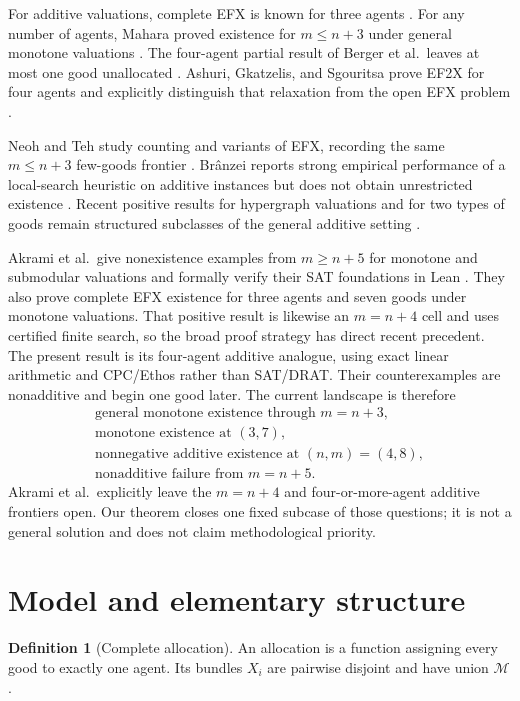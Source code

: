 \documentclass[11pt]{article}
\theoremstyle{definition}
\newtheorem{definition}[theorem]{Definition}
\newcommand{\M}{\mathcal{M}}
\begin{document}
For additive valuations, complete EFX is known for three agents
\cite{CGM2024}. For any number of agents, Mahara proved existence for
$m\le n+3$ under general monotone valuations \cite{Mahara2021}. The
four-agent partial result of Berger et al.\ leaves at most one good
unallocated \cite{Berger2022}. Ashuri, Gkatzelis, and Sgouritsa prove EF2X
for four agents and explicitly distinguish that relaxation from the open EFX
problem \cite{Ashuri2025}.

Neoh and Teh study counting and variants of EFX, recording the same
$m\le n+3$ few-goods frontier \cite{NeohTeh2025}. Br\^anzei reports strong
empirical performance of a local-search heuristic on additive instances but
does not obtain unrestricted existence \cite{Branzei2025}. Recent positive
results for hypergraph valuations and for two types of goods remain
structured subclasses of the general additive setting
\cite{Lianeas2026,Davidiuk2026}.

Akrami et al.\ give nonexistence examples from $m\ge n+5$ for monotone and
submodular valuations and formally verify their SAT foundations in Lean
\cite{Akrami2026}. They also prove complete EFX existence for three agents
and seven goods under monotone valuations. That positive result is likewise
an $m=n+4$ cell and uses certified finite search, so the broad proof strategy
has direct recent precedent. The present result is its four-agent additive
analogue, using exact linear arithmetic and CPC/Ethos rather than
SAT/DRAT. Their counterexamples are nonadditive and begin one good later.
The current landscape is therefore
\[
\begin{array}{c}
\text{general monotone existence through }m=n+3,\\[2mm]
\text{monotone existence at }(3,7),\\[2mm]
\boxed{\text{nonnegative additive existence at }(n,m)=(4,8)},\\[2mm]
\text{nonadditive failure from }m=n+5.
\end{array}
\]
Akrami et al.\ explicitly leave the $m=n+4$ and four-or-more-agent additive
frontiers open. Our theorem closes one fixed subcase of those questions; it
is not a general solution and does not claim methodological priority.

\section{Model and elementary structure}\label{sec:model}

\begin{definition}[Complete allocation]
An allocation is a function assigning every good to exactly one agent. Its
bundles $X_i$ are pairwise disjoint and have union $\M$.
\end{definition}
\end{document}
